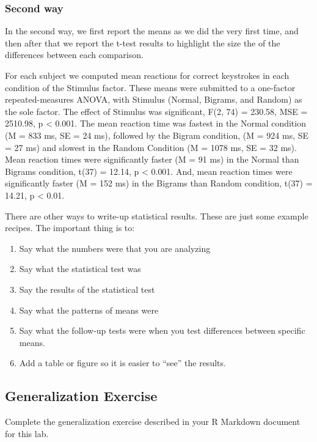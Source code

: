 \documentclass[]{book}
\providecommand{\tightlist}{%
  \setlength{\itemsep}{0pt}\setlength{\parskip}{0pt}}
\theoremstyle{definition}
\theoremstyle{definition}
\theoremstyle{definition}
\theoremstyle{remark}
\begin{document}
\subsubsection{Second way}\label{second-way}

In the second way, we first report the means as we did the very first
time, and then after that we report the t-test results to highlight the
size the of the differences between each comparison.

For each subject we computed mean reactions for correct keystrokes in
each condition of the Stimulus factor. These means were submitted to a
one-factor repeated-measures ANOVA, with Stimulus (Normal, Bigrams, and
Random) as the sole factor. The effect of Stimulus was significant, F(2,
74) = 230.58, MSE = 2510.98, p \textless{} 0.001. The mean reaction time
was fastest in the Normal condition (M = 833 ms, SE = 24 ms), followed
by the Bigram condition, (M = 924 ms, SE = 27 ms) and slowest in the
Random Condition (M = 1078 ms, SE = 32 ms). Mean reaction times were
significantly faster (M = 91 ms) in the Normal than Bigrams condition,
t(37) = 12.14, p \textless{} 0.001. And, mean reaction times were
significantly faster (M = 152 ms) in the Bigrams than Random condition,
t(37) = 14.21, p \textless{} 0.01.

There are other ways to write-up statistical results. These are just
some example recipes. The important thing is to:

\begin{enumerate}
\def\labelenumi{\arabic{enumi}.}
\tightlist
\item
  Say what the numbers were that you are analyzing
\item
  Say what the statistical test was
\item
  Say the results of the statistical test
\item
  Say what the patterns of means were
\item
  Say what the follow-up tests were when you test differences between
  specific means.
\item
  Add a table or figure so it is easier to ``see'' the results.
\end{enumerate}

\subsection{Generalization Exercise}\label{generalization-exercise-6}

Complete the generalization exercise described in your R Markdown
document for this lab.
\end{document}
